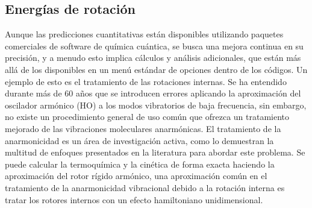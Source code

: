 \documentclass[12pt,letterpaper]{article}
\begin{document}
\subsection{Energías de rotación}
Aunque las predicciones cuantitativas están disponibles utilizando paquetes comerciales de software de química cuántica, se busca una mejora continua en su precisión, y a menudo esto implica cálculos y análisis adicionales, que están más allá de los disponibles en un menú estándar de opciones dentro de los códigos. Un ejemplo de esto es el tratamiento de las rotaciones internas. Se ha entendido durante más de 60 años que se introducen errores aplicando la aproximación del oscilador armónico (HO) a los modos vibratorios de baja frecuencia, sin embargo, no existe un procedimiento general de uso común que ofrezca un tratamiento mejorado de las vibraciones moleculares anarmónicas. El tratamiento de la anarmonicidad es un área de investigación activa, como lo demuestran la multitud de enfoques presentados en la literatura para abordar este problema. 
Se puede calcular la termoquímica y la cinética de forma exacta haciendo la aproximación del rotor rígido armónico, una aproximación común en el tratamiento de la anarmonicidad vibracional debido a la rotación interna es tratar los rotores internos con un efecto hamiltoniano unidimensional.
\\
\end{document}
